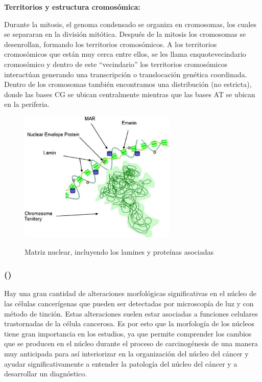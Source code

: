 \documentclass[12pt, letterpaper]{article}
\begin{document}
\pagebreak

\textbf{Territorios y estructura cromosómica:}

Durante la mitosis,  el genoma condensado se organiza en cromosomas, los cuales se separaran en la división mitótica. Después de la mitosis los cromosomas se desenrollan, formando los territorios cromosómicos. A los territorios cromosómicos que están muy cerca entre ellos, se les llama enquote{vecindario} cromosómico y dentro de este \enquote{vecindario} los territorios cromosómicos interactúan generando una transcripción o translocación genética coordinada. Dentro de los cromosomas también encontramos una distribución (no estricta), donde las bases CG se ubican centralmente mientras que las bases AT se ubican en la periferia.


\begin{figure}[h]
\centering
	\includegraphics[width=7.5cm]{nucleus-matrix-rynearsonNuclearStructureOrganization2011.jpg}
	\label{fig: nuclear-matrix}
	\caption{Matriz nuclear, incluyendo los lamines y proteínas asociadas}
	\autocite{rynearsonNuclearStructureOrganization2011}
\end{figure}
\newpage

\subsubsection{\texorpdfstring{ (\citeauthor{deyCancerNucleusMorphology2010})}{}}

Hay una gran cantidad de alteraciones morfológicas significativas en el núcleo de las células cancerígenas que pueden ser detectadas por microscopía de luz y con método de tinción. Estas alteraciones suelen estar asociadas a funciones celulares trastornadas de la célula cancerosa. Es por esto que la morfología de los núcleos tiene gran importancia en los estudios, ya que permite comprender los cambios que se producen en el núcleo durante el proceso de carcinogénesis de una manera muy anticipada para así interiorizar en la organización del núcleo del cáncer y ayudar significativamente a entender la patología del núcleo del cáncer y a desarrollar un diagnóstico.
\end{document}
